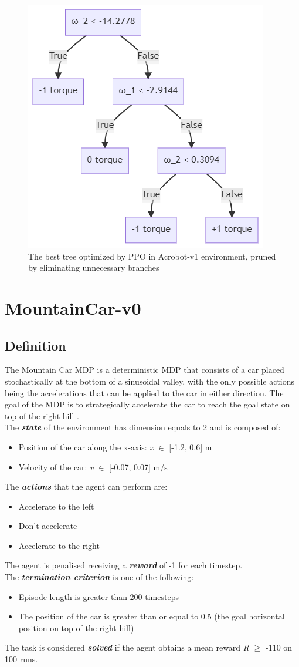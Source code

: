 \begin{figure}[h!]
    \centering
    \includegraphics[width=0.4\linewidth]{images/Acrobot/bestPPOprunedAB.png}
    \caption{The best tree optimized by PPO in Acrobot-v1 environment, pruned by eliminating unnecessary branches}
    \label{fig:BestTreeAB}
\end{figure}

\newpage

\section{MountainCar-v0}
\label{sec:430}
\subsection{Definition}
\label{subsec:431}
The Mountain Car MDP is a deterministic MDP that consists of a car placed stochastically at the bottom of a sinusoidal valley, with the only possible actions being the accelerations that can be applied to the car in either direction. The goal of the MDP is to strategically accelerate the car to reach the goal state on top of the right hill \cite{gym} \cite{mountaincar}.\\[0.3in]
The \textit{\textbf{state}} of the environment has dimension equals to 2 and is composed of:
\begin{itemize}
    \item Position of the car along the x-axis: \textit{x} \(\in\) [-1.2, 0.6] m
    \item Velocity of the car: \textit{v} \(\in\) [-0.07, 0.07] m/s
\end{itemize}
The \textit{\textbf{actions}} that the agent can perform are:
\begin{itemize}
    \item Accelerate to the left
    \item Don't accelerate
    \item Accelerate to the right
\end{itemize}
The agent is penalised receiving a \textit{\textbf{reward}} of -1 for each timestep.\\[0.1in]
The \textit{\textbf{termination criterion}} is one of the following:
\begin{itemize}
    \item Episode length is greater than 200 timesteps
    \item The position of the car is greater than or equal to 0.5 (the goal horizontal position on top of the right hill)
\end{itemize}
The task is considered \textit{\textbf{solved}} if the agent obtains a mean reward \textit{R} \(\geq\) -110 on 100 runs.


